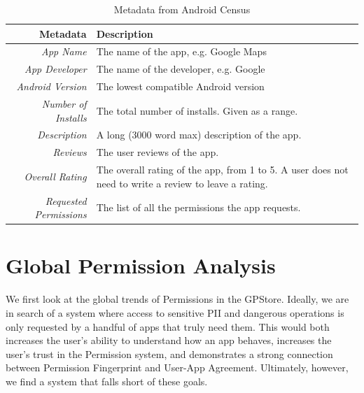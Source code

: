 \begin{table}[h]
\begin{small}
\begin{tabular}{r|l}
Metadata & Description \\
\hline

\textit{App Name} & The name of the app, e.g. Google Maps  \\
\textit{App Developer} & The name of the developer, e.g. Google  \\
\textit{Android Version} & The lowest compatible Android version  \\
\textit{Number of Installs} &  The total number of installs. Given as a range. \\
\textit{Description} &  A long (3000 word max) description of the app. \\
\textit{Reviews} &  The user reviews of the app. \\
\textit{Overall Rating} &  The overall rating of the app, from 1 to 5. A user does not need to write a review to leave a rating. \\
\textit{Requested Permissions} &  The list of all the permissions the app requests. \\

\end{tabular}
\end{small}
\caption{Metadata from Android Census}
\label{tab:marketmetadata}
\end{table}



\section{Global Permission Analysis}
We first look at the global trends of Permissions in the GPStore. Ideally, we are in search of a system where access to sensitive PII and dangerous operations is only requested by a handful of apps that truly need them. This would both increases the user's ability to understand how an app behaves, increases the user's trust in the Permission system, and demonstrates a strong connection between Permission Fingerprint and User-App Agreement. Ultimately, however, we find a system that falls short of these goals.

